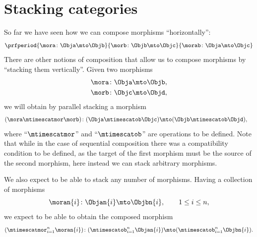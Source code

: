 
\section{Stacking categories}
\label{sec:parallel-stacking}

So far we have seen how we can compose morphisms ``horizontally'':
%
\begin{equation}
    \prfperiod{
        \mora \colon \Obja \mto \Objb
    }{
        \morb\colon \Objb \mto \Objc
    }{
        \morab \colon \Obja \mto \Objc
    }
\end{equation}
%
There are other notions of composition that allow us to compose morphisms by ``stacking them vertically''.
Given two morphisms
%
\begin{align}
    \mora & \colon \Obja \mto \Objb, \\
    \morb & \colon \Objc \mto \Objd,
\end{align}
%
we will obtain by parallel stacking a morphism
%
\begin{align}
    (\mora\mtimescatmor \morb)
     & \colon (\Obja \mtimescatob \Objc) \mto (\Objb \mtimescatob \Objd),
\end{align}
%
where ``$\mtimescatmor$'' and ``$\mtimescatob$'' are operations to be defined.
Note that while in the case of sequential composition there was a compatibility condition to be defined, as the target of the first morphism must be the source of the second morphism, here instead we can stack arbitrary morphisms.

We also expect to be able to stack any number of morphisms.
Having a collection of morphisms
%
\begin{equation}
    \moran{i} \colon \Objan{i} \mto \Objbn{i}, \qquad 1 \leq i \leq n,
\end{equation}
%
we expect to be able to obtain the composed morphism
%
\begin{equation}
    (\mtimescatmor_{i=1}^n \moran{i} )
    \colon( \mtimescatob_{i=1}^n \Objan{i} )\mto (\mtimescatob_{i=1}^n \Objbn{i}).
\end{equation}

\begin{marginfigure}
    \centering
    \caption{Stacked morphisms}
    \label{fig:stacked-morphisms}
\end{marginfigure}

